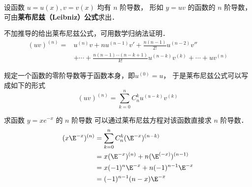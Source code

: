 

设函数 $u=u(x), v=v(x)$ 均有 $n$ 阶导数， 形如 $y=uv$ 的函数的 $n$ 阶导数， 可由\textbf{莱布尼兹（Leibniz）公式}求出．

不加推导的给出莱布尼兹公式，可用数学归纳法证明．
\begin{equation}
\begin{aligned}
(uv)^{(n)}=&u^{(n)}v+nu^{(n-1)}v'+\frac{n(n-1)}{2!}u^{(n-2)}v'' \\
&+ \cdots +\frac{n(n-1) \cdots (n-k+1)}{k!}u^{(n-k)}v^{(k)}+\cdots+uv^{(n)}
\end{aligned}
\end{equation}

规定一个函数的零阶导数等于函数本身，即$u^{(0)}=u$， 于是莱布尼兹公式可以写成如下的形式
\begin{equation}
(uv)^{(n)}=\sum_{k=0}^{n} C_{n}^{k}u^{(u-k)}v^{(k)}
\end{equation}

\begin{example}{求函数 $y=xe^{-x}$ 的 $n$ 阶导数}
可以通过莱布尼兹方程对该函数直接求 $n$ 阶导数．
\begin{equation}
\begin{aligned}
(x\E^{-x})^{(n)}&=\sum_{k=0}^{n} C_{n}^{k}(\E^{-x})^{(n-k)}\\
&=x(\E^{-x})^{(n)}+n(\E^{(-x)})^{(n-1)}\\
&=x(-1)^n\E^{-x}+n(-1)^{n-1}\E^{-x}\\
&=(-1)^{n-1}(n-x)\E^{-x}
\end{aligned}
\end{equation}
\end{example}
